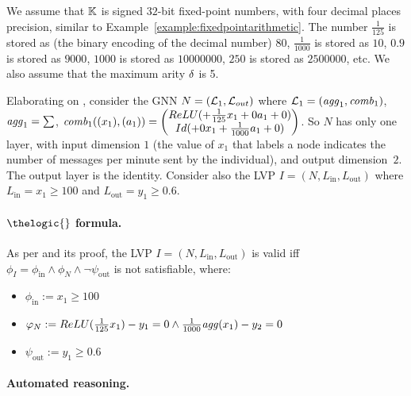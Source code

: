 
\label{sec:complete-example}
We assume that $\mathbb K$ is signed $32$-bit fixed-point numbers, with four decimal places precision, similar to Example~\ref{example:fixedpointarithmetic}.
%
The number $\frac{1}{125}$ is stored as (the binary encoding of the decimal number) $80$, $\frac{1}{1000}$ is stored as $10$, $0.9$ is stored as $9000$, $1000$ is stored as $10000000$, $250$ is stored as $2500000$, etc.
%
We also assume that the maximum arity $\delta$ is 5.

Elaborating on , consider the GNN $N = (\mathcal{L}_1, \mathcal{L}_{out})$ where $\mathcal{L}_1 = (\mathit{agg}_1, \mathit{comb}_1)$, $\mathit{agg}_1 = \sum$, $\mathit{comb}_1((x_1), (a_1)) = \begin{pmatrix}
    ReLU(+\frac{1}{125}x_1 + 0a_1 + 0) \\
    Id(+0x_1 + \frac{1}{1000}a_1+ 0)
    \end{pmatrix}
    $.
So $N$ has only one layer, with input dimension $1$ (the value of $x_1$ that labels a node indicates the number of messages per minute sent by the individual), and output dimension~$2$. The output layer is the identity.
%
%
Consider also the LVP $I = (N, L_{\text{in}}, L_{\text{out}})$ where $L_{\text{in}} = x_1 \geq 100$ and $L_{\text{out}} = y_1 \geq 0.6$.
%




\paragraph{$\thelogic{}$ formula.}

As per  and its proof,
the LVP $I = (N, L_{\text{in}}, L_{\text{out}})$ is valid iff $\phi_I = \phi_{\text{in}} \land \phi_N \land \lnot \psi_{\text{out}}$ is not satisfiable, where:
\begin{itemize}
    \item $\phi_{\text{in}} := x_1 \geq 100$
    \item $\varphi_N := ReLU(\frac{1}{125} x_1) - y_1 = 0 \land \frac{1}{1000}\mathit{agg}(x_1) - y_2 = 0$
    \item $\psi_{\text{out}} := y_1 \geq 0.6$
\end{itemize}

\paragraph{Automated reasoning.}

